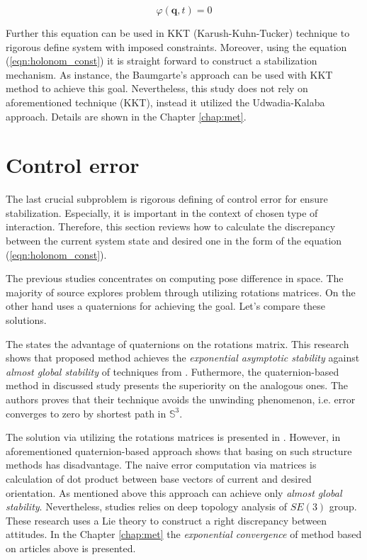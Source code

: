\begin{equation}
    \label{eqn:holonom_const}
    \varphi (\mathbf{q}, t) = 0
\end{equation}

Further this equation can be used in KKT (Karush-Kuhn-Tucker) technique to 
rigorous define system with imposed constraints. Moreover, using the equation
(\ref{eqn:holonom_const}) it is straight forward to construct a stabilization 
mechanism. As instance, the Baumgarte's approach can be used with KKT method 
to achieve this goal. Nevertheless, this study does not rely on aforementioned 
technique (KKT), instead it utilized the Udwadia-Kalaba approach. Details are 
shown in the Chapter \ref{chap:met}.

\section{Control error} \label{sec:control_error}

The last crucial subproblem is rigorous defining of control error for ensure 
stabilization. Especially, it is important in the context of chosen type of 
interaction. Therefore, this section reviews how to calculate the discrepancy 
between the current system state and desired one in the form of the equation 
(\ref{eqn:holonom_const}). 

The previous studies \cite{SlidingOnManifoldsQuat,GeomControlQuadSE3,
RigidBodyAttCon,OutFeedbackStabForOrbRob,ANonlinearObserverUsingPose} 
concentrates on computing pose difference in space. The majority 
\cite{GeomControlQuadSE3,RigidBodyAttCon,OutFeedbackStabForOrbRob,
ANonlinearObserverUsingPose} of source explores problem through utilizing 
rotations matrices. On the other hand \cite{SlidingOnManifoldsQuat} uses 
a quaternions for achieving the goal. Let's compare these solutions.

The \cite{SlidingOnManifoldsQuat} states the advantage of quaternions on 
the rotations matrix. This research shows that proposed method achieves 
the \emph{exponential asymptotic stability} against \emph{almost global 
stability} of techniques from \cite{GeomControlQuadSE3,RigidBodyAttCon}.
Futhermore, the quaternion-based method in discussed study presents the 
superiority on the analogous ones. The authors proves that their technique 
avoids the unwinding phenomenon, i.e. error converges to zero by shortest 
path in $\mathbb{S}^3$.

The solution via utilizing the rotations matrices is presented in 
\cite{GeomControlQuadSE3,RigidBodyAttCon,OutFeedbackStabForOrbRob,
ANonlinearObserverUsingPose}. However, in aforementioned quaternion-based 
approach shows that basing on such structure methods has disadvantage. 
The naive error computation via matrices is calculation of dot product 
between base vectors of current and desired orientation. As mentioned 
above this approach can achieve only \emph{almost global stability}. 
Nevertheless, studies \cite{OutFeedbackStabForOrbRob, ANonlinearObserverUsingPose} 
relies on deep topology analysis of $SE(3)$ group. These research uses 
a Lie theory to construct a right discrepancy between attitudes. In 
the Chapter \ref{chap:met} the \emph{exponential convergence} of method 
based on articles above is presented.
